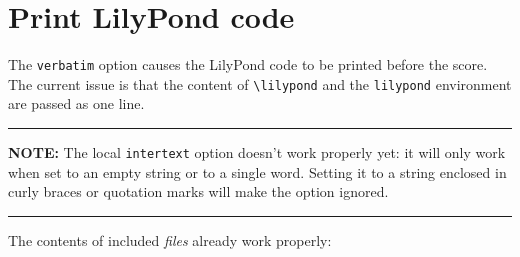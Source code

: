 \documentclass{scrartcl}
\begin{document}
\section*{Print LilyPond code}

The \texttt{verbatim} option causes the LilyPond code to be printed before the score.  The current issue is that the content of \texttt{\textbackslash lilypond} and the \texttt{lilypond} environment are passed as one line.


\hrule

\textbf{NOTE:} The local \texttt{intertext} option doesn't work properly yet: it will only work when set to an empty string or to a single word. Setting it to a string enclosed in curly braces or quotation marks will make the option ignored.


\hrule

\medskip
\renewcommand{\lyIntertext}[1]{

\textcolor{magenta}{#1}

\bigskip
}
The contents of included \emph{files} already work properly:


\end{document}
